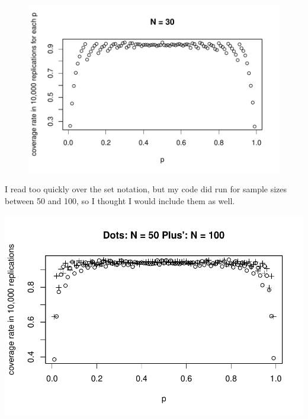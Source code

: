 \documentclass{article}\usepackage[]{graphicx}\usepackage[]{color}
\makeatletter
\def\maxwidth{ %
  \ifdim\Gin@nat@width>\linewidth
    \linewidth
  \else
    \Gin@nat@width
  \fi
}
\newenvironment{knitrout}{}{} %
\makeatother
\begin{document}
\begin{enumerate}
\begin{figure}[h!]
\begin{knitrout}
{}



\end{knitrout}
\end{figure}






\begin{figure}[h!]
\begin{knitrout}
\color{fgcolor}

{\centering \includegraphics[width=\maxwidth]{figure/prob1_part2_plot-1} 

}



\end{knitrout}
\end{figure}






I read too quickly over the set notation, but my code did run for sample sizes between 50 and 100, so I thought I would include them as well.
\begin{knitrout}
\color{fgcolor}

{\centering \includegraphics[width=\maxwidth]{figure/prob1_final-1} 

}
\end{knitrout}
\end{enumerate}
\end{document}
